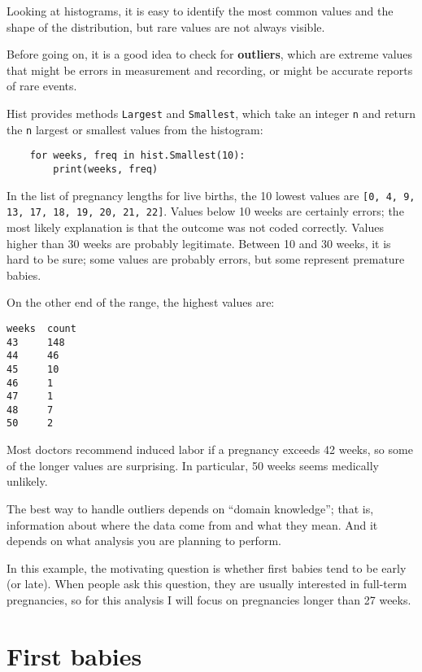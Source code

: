 \documentclass[12pt]{book}
\begin{document}
Looking at histograms, it is easy to identify the most common
values and the shape of the distribution, but rare values are
not always visible.

Before going on, it is a good idea to check for {\bf
  outliers}, which are extreme values that might be errors in
measurement and recording, or might be accurate reports of rare
events.

Hist provides methods {\tt Largest} and {\tt Smallest}, which take
an integer {\tt n} and return the {\tt n} largest or smallest
values from the histogram:

\begin{verbatim}
    for weeks, freq in hist.Smallest(10):
        print(weeks, freq)
\end{verbatim}

In the list of pregnancy lengths for live births, the 10 lowest values
are {\tt [0, 4, 9, 13, 17, 18, 19, 20, 21, 22]}.  Values below 10 weeks
are certainly errors; the most likely explanation is that the outcome
was not coded correctly.  Values higher than 30 weeks are probably
legitimate.  Between 10 and 30 weeks, it is hard to be sure; some
values are probably errors, but some represent premature babies.

On the other end of the range, the highest values are:
%
\begin{verbatim}
weeks  count
43     148
44     46
45     10
46     1
47     1
48     7
50     2
\end{verbatim}

Most doctors recommend induced labor if a pregnancy exceeds 42 weeks,
so some of the longer values are surprising.  In particular, 50 weeks
seems medically unlikely.

The best way to handle outliers depends on ``domain knowledge'';
that is, information about where the data come from and what they
mean.  And it depends on what analysis you are planning to perform.

In this example, the motivating question is whether first babies
tend to be early (or late).  When people ask this question, they are
usually interested in full-term pregnancies, so for this analysis
I will focus on pregnancies longer than 27 weeks.


\section{First babies}
\end{document}
